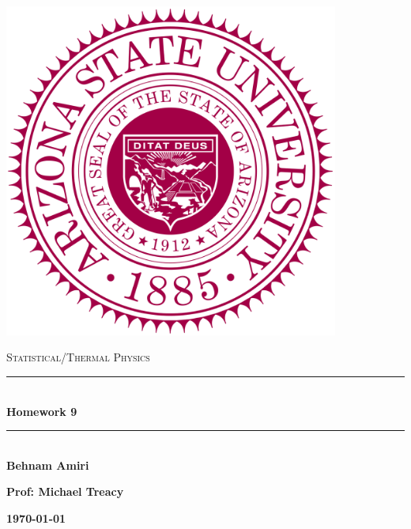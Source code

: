 \documentclass[fleqn]{article}
\begin{document}
  \begin{titlepage}

    \newcommand{\HRule}{\rule{\linewidth}{0.5mm}}

    \center

    \begin{center}
      \includegraphics[height=11cm, width=11cm]{asu.png}
    \end{center}

    \vline

    \textsc{\LARGE Statistical/Thermal Physics}\\[1.5cm]

    \HRule \\[0.5cm]
    { \huge \bfseries Homework 9}\\[0.4cm] 
    \HRule \\[1.0cm]

    \textbf{Behnam Amiri}

    \bigbreak

    \textbf{Prof: Michael Treacy}

    \bigbreak

    \textbf{{\large \today}\\[2cm]}

    \vfill

  \end{titlepage}
\end{document}
